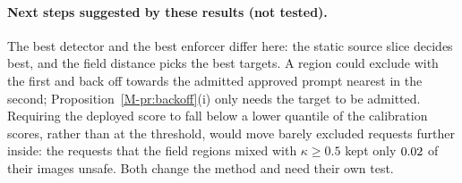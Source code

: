 \documentclass{article}
\newcommand{\mref}[1]{\ref{M-#1}}        %
\begin{document}
\paragraph{Next steps suggested by these results (not tested).} The best detector and the best enforcer differ here: the static
source slice decides best, and the field distance picks the best targets. A region could exclude with the first and back off towards
the admitted approved prompt nearest in the second; Proposition~\mref{pr:backoff}(i) only needs the target to be admitted. Requiring
the deployed score to fall below a lower quantile of the calibration scores, rather than at the threshold, would move barely excluded
requests further inside: the requests that the field regions mixed with $\kappa\ge0.5$ kept only $0.02$ of their images
unsafe. Both change the method and need their own test.



\end{document}
